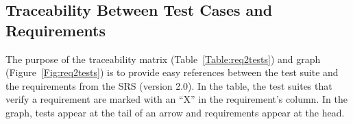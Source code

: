 \documentclass[12pt, titlepage]{article}
\newcommand{\srsVersion}{2.0}
\begin{document}
%
%
%	
%	
%	
%	
%	
%	
%	
%
%
%	
%	
%	
%	
%	
%	
%	
%	
%	
%	
%	
%	
%	

\subsection{Traceability Between Test Cases and Requirements}
The purpose of the traceability matrix (Table~\ref{Table:req2tests})
and graph (Figure~\ref{Fig:req2tests}) is to provide easy references between 
the test suite and the requirements from the SRS (version \srsVersion{}). In 
the table, the test suites that verify a requirement are marked with an ``X'' 
in the requirement's column. In the graph, tests appear at the tail of an
arrow and requirements appear at the head.
\end{document}
